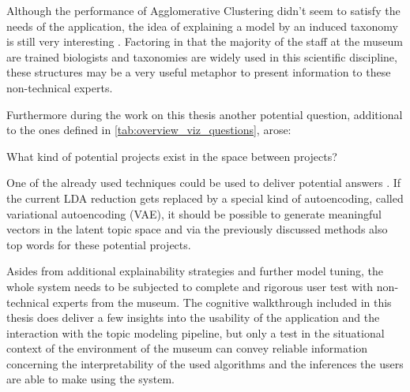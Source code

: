 Although the performance of Agglomerative Clustering didn't seem to satisfy the needs of the application, the idea of explaining a model by an induced taxonomy is still very interesting \cite{Liu:2018:INE:3219819.3220001}. Factoring in that the majority of the staff at the museum are trained biologists and taxonomies are widely used in this scientific discipline, these structures may be a very useful metaphor to present information to these non-technical experts.

Furthermore during the work on this thesis another potential question, additional to the ones defined in \autoref{tab:overview_viz_questions}, arose:
\begin{center}
	What kind of potential projects exist in the space between projects?
\end{center}
One of the already used techniques could be used to deliver potential answers . If the current LDA reduction gets replaced by a special kind of autoencoding, called variational autoencoding (VAE), it should be possible to generate meaningful vectors in the latent topic space and via the previously discussed methods also top words for these potential projects. 

Asides from additional explainability strategies and further model tuning, the whole system needs to be subjected to complete and rigorous user test with non-technical experts from the museum. The cognitive walkthrough included in this thesis does deliver a few insights into the usability of the application and the interaction with the topic modeling pipeline, but only a test in the situational context of the environment of the museum can convey reliable information concerning the interpretability of the used algorithms and the inferences the users are able to make using the system.
